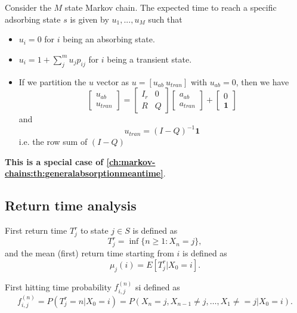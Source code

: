 \begin{refsection}
\begin{corollary}\cite[99]{privault2013understanding}
	Consider the $M$ state Markov chain. The expected time  to reach a specific adsorbing state $s$ is given by $u_1,...,u_M$ such that
	\begin{itemize}
		\item $u_i = 0$ for $i$ being an absorbing state.
		\item $u_i = 1 + \sum_{j}^m u_jp_{ij}$ for $i$ being a transient state. 
		\item If we partition the $u$ vector as $u = [u_{ab} ~u_{tran}]$ with $u_{ab} = 0$, then we have
		$$\begin{bmatrix}
		u_{ab}\\
		u_{tran}
		\end{bmatrix} =\begin{bmatrix}
		I_r & 0 \\ R & Q
		\end{bmatrix} \begin{bmatrix}
		a_{ab}\\
		a_{tran}
		\end{bmatrix} + \begin{bmatrix}
		0\\
		\bm{1}
		\end{bmatrix}$$
		and
		$$u_{tran} = (I-Q)^{-1}\bm{1}$$
		i.e. the row sum of $(I-Q)$
	\end{itemize}
\end{corollary}



\begin{remark}
	\textbf{This is a special case of \autoref{ch:markov-chains:th:generalabsorptionmeantime}}.
\end{remark}


\subsection{Return time analysis}
\begin{definition}
First return time $T^r_j$ to state $j\in S$ is defined as
$$T_j^r = \inf\{n\geq 1:X_n = j\},$$
and the mean (first) return time starting from $i$ is defined as
$$\mu_j(i) = E[T_j^r|X_0 = i].$$

	
	
First hitting time probability $f_{i,j}^{(n)}$ si defined as
$$f_{i,j}^{(n)} = P(T_{j}^r = n|X_0 = i) = P(X_n=j,X_{n-1}\neq j, \dots, X_1 \neq =j|X_0 = i).$$
\end{definition}



\end{refsection}
